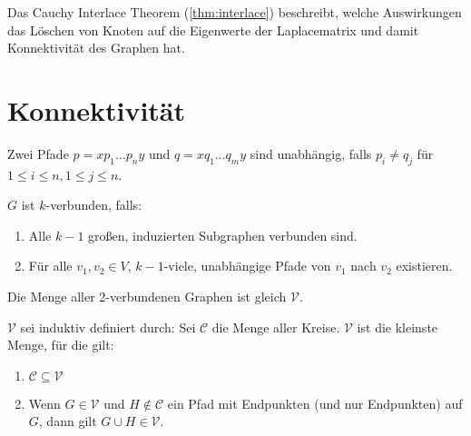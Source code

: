 \begin{remark}
    Das Cauchy Interlace Theorem (\ref{thm:interlace}) beschreibt, welche Auswirkungen das Löschen von Knoten auf die Eigenwerte der Laplacematrix und damit Konnektivität des Graphen hat.
\end{remark}

\section{Konnektivität}

\begin{definition}
    Zwei Pfade $ p = x p_1 \dots p_n y $ und $ q = x q_1 \dots q_m y $ sind unabhängig, falls $ p_i \neq q_j $ für $ 1 \leq i \leq n, 1 \leq j \leq n $.
\end{definition}

\begin{proposition}
    \label{prp:char-k-connected}
    $ G $ ist $ k $-verbunden, falls:
    \begin{enumerate}
        \item Alle $ k - 1 $ großen, induzierten Subgraphen verbunden sind.
        \item Für alle $ v_1, v_2 \in V $, $ k - 1 $-viele, unabhängige Pfade von $ v_1 $ nach $ v_2 $ existieren.
    \end{enumerate}
\end{proposition}

\begin{proposition}
    \label{prp:char-2-connected}
    Die Menge aller 2-verbundenen Graphen ist gleich $ \mathcal{V} $.

    $ \mathcal{V} $ sei induktiv definiert durch:
    Sei $ \mathcal{C} $ die Menge aller Kreise.
    $ \mathcal{V} $ ist die kleinste Menge, für die gilt:
    \begin{enumerate}
        \item $ \mathcal{C} \subseteq \mathcal{V} $
        \item Wenn $ G \in \mathcal{V} $ und $ H \notin \mathcal{C} $ ein Pfad mit Endpunkten (und nur Endpunkten) auf $ G $, dann gilt $ G \cup H \in \mathcal{V} $.
    \end{enumerate}
\end{proposition}

